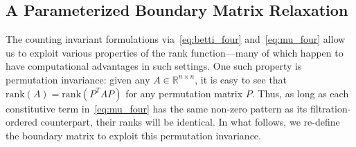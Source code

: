 \documentclass[12pt]{article}
\numberwithin{equation}{section}
\newcommand{\+}{%
	\raisebox{0.18ex}{\scaleobj{0.55}{+}}
}
\theoremstyle{definition}
\begin{document}
\subsection{A Parameterized Boundary Matrix Relaxation}
The counting invariant formulations via~\eqref{eq:betti_four} and~\eqref{eq:mu_four} allow us to exploit various properties of the rank function---many of which happen to have computational advantages in such settings. One such property is permutation invariance: given any $A \in \mathbb{R}^{n \times n}$, it is easy to see that $\mathrm{rank}(A) = \mathrm{rank}(P^T A P)$ for any permutation matrix $P$. Thus, as long as each constitutive term in~\eqref{eq:mu_four} has the same non-zero pattern as its filtration-ordered counterpart, their ranks will be identical. 
In what follows, we re-define the boundary matrix to exploit this permutation invariance. 
 
\end{document}
